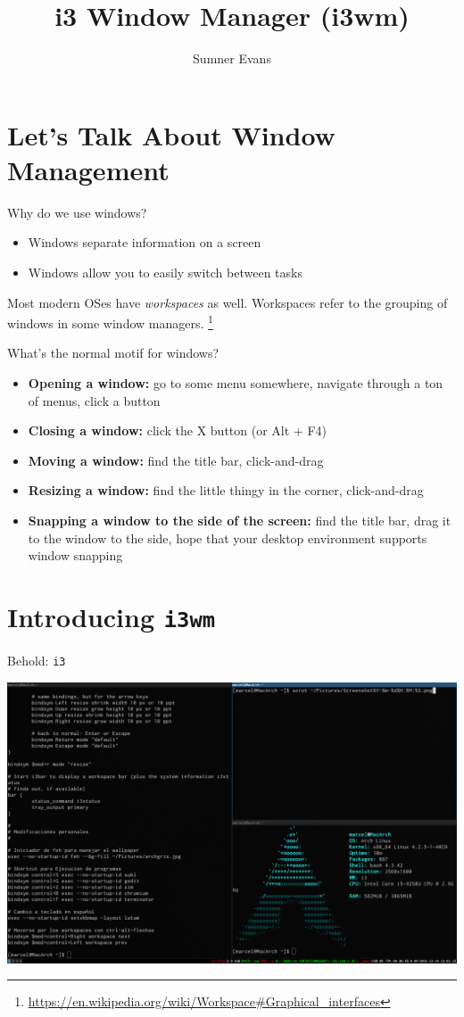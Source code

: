 \documentclass{lug}
\title{i3 Window Manager (i3wm)}
\author{Sumner Evans}
\institute{Mines Linux Users Group}
\newcommand{\ithree}{\texttt{i3}\xspace}
\begin{document}
\section{Let's Talk About Window Management}
\begin{frame}{Why do we use windows?}
    \begin{itemize}
        \item Windows separate information on a screen
        \item Windows allow you to easily switch between tasks
    \end{itemize}

    Most modern OSes have \textit{workspaces} as well. Workspaces refer to the
    grouping of windows in some window
    managers.
    \footnote[frame]{\url{https://en.wikipedia.org/wiki/Workspace\#Graphical\_interfaces}}

\end{frame}

\begin{frame}{What's the normal motif for windows?}
    \begin{itemize}[<+->]
        \item \textbf{Opening a window:} go to some menu somewhere, navigate
            through a ton of menus, click a button
        \item \textbf{Closing a window:} click the X button (or Alt + F4)
        \item \textbf{Moving a window:} find the title bar, click-and-drag
        \item \textbf{Resizing a window:} find the little thingy in the corner,
            click-and-drag
        \item \textbf{Snapping a window to the side of the screen:} find the
            title bar, drag it to the window to the side, hope that your desktop
            environment supports window snapping
    \end{itemize}
\end{frame}

\section{Introducing \texttt{i3wm}}
\begin{frame}{Behold: \ithree}
    \hspace{1em}
    \centerline{\includegraphics[width=1.15\textwidth]{./graphics/i3-desktop}}
\end{frame}
\end{document}
